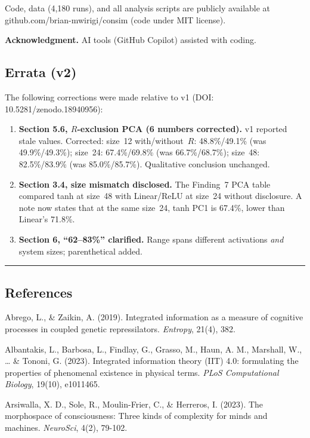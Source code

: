 \documentclass[
  11pt,
]{article}
\begin{document}
Code, data (4,180 runs), and all analysis scripts are publicly available
at github.com/brian-mwirigi/consim (code under MIT license).

\textbf{Acknowledgment.} AI tools (GitHub Copilot) assisted with coding.

\subsection*{Errata (v2)}

The following corrections were made relative to v1 (DOI: 10.5281/zenodo.18940956):

\begin{enumerate}
\item \textbf{Section 5.6, \(R\)-exclusion PCA (6 numbers corrected).}
  v1 reported stale values. Corrected:
  size~12 with/without~\(R\): 48.8\%/49.1\% (was 49.9\%/49.3\%);
  size~24: 67.4\%/69.8\% (was 66.7\%/68.7\%);
  size~48: 82.5\%/83.9\% (was 85.0\%/85.7\%).
  Qualitative conclusion unchanged.
\item \textbf{Section 3.4, size mismatch disclosed.}
  The Finding~7 PCA table compared tanh at size~48 with Linear/ReLU at
  size~24 without disclosure. A note now states that at the same size~24,
  tanh PC1 is 67.4\%, lower than Linear's 71.8\%.
\item \textbf{Section 6, ``62--83\%'' clarified.}
  Range spans different activations \emph{and} system sizes; parenthetical
  added.
\end{enumerate}

\begin{center}\rule{0.5\linewidth}{0.5pt}\end{center}

\subsection{References}\label{references}

Abrego, L., \& Zaikin, A. (2019). Integrated information as a measure of
cognitive processes in coupled genetic repressilators. \emph{Entropy},
21(4), 382.

Albantakis, L., Barbosa, L., Findlay, G., Grasso, M., Haun, A. M.,
Marshall, W., \ldots{} \& Tononi, G. (2023). Integrated information
theory (IIT) 4.0: formulating the properties of phenomenal existence in
physical terms. \emph{PLoS Computational Biology}, 19(10), e1011465.

Arsiwalla, X. D., Sole, R., Moulin-Frier, C., \& Herreros, I. (2023).
The morphospace of consciousness: Three kinds of complexity for minds
and machines. \emph{NeuroSci}, 4(2), 79-102.
\end{document}
